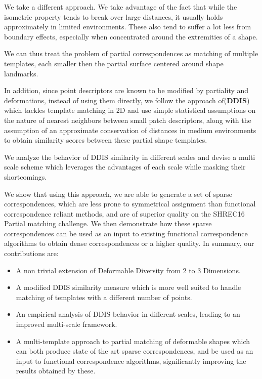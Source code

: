 \documentclass[10pt,twocolumn,letterpaper]{article}
\begin{document}
We take a different approach. We take advantage of the fact that while the isometric property tends to break over large distances, it usually holds approximately in limited environments. These also tend to suffer a lot less from boundary effects, especially when concentrated around the extremities of a shape. 

We can thus treat the problem of partial correspondences as matching of multiple templates, each smaller then the partial surface centered around shape landmarks. 

In addition, since point descriptors are known to be modified by partiality and deformations, instead of using them directly, we follow the approach of\cite{talmi2017template}(\textbf{DDIS}) which tackles template matching in 2D and use simple statistical assumptions on the nature of nearest neighbors between small patch descriptors, along with the assumption of an approximate conservation of distances in medium environments to obtain similarity scores between these partial shape templates.

We analyze the behavior of DDIS similarity in different scales and devise a multi scale scheme which leverages the advantages of each scale while masking their shortcomings.

We show that using this approach, we are able to generate a set of sparse correspondences, which are less prone to symmetrical assignment than functional correspondence reliant methods, and are of superior quality on the SHREC16 Partial matching challenge\cite{cosmo2016shrec}. We then demonstrate how these sparse correspondences can be used as an input to existing functional correspondence algorithms to obtain dense correspondences or a higher quality.
In summary, our contributions are:
\begin{itemize}
	\item A non trivial extension of Deformable Diversity from 2 to 3 Dimensions.
	\item A modified DDIS similarity measure which is more well suited to handle matching of templates with a different number of points.
	\item An empirical analysis of DDIS behavior in different scales, leading to an improved multi-scale framework.
	\item A multi-template approach to partial matching of deformable shapes which can both produce state of the art sparse correspondences, and be used as an input to functional correspondence algorithms, significantly improving the results obtained by these.
\end{itemize}
\end{document}
